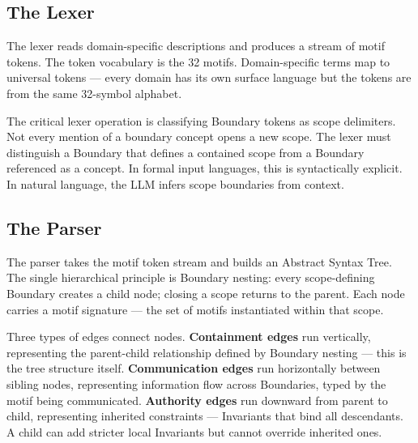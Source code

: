 \documentclass[11pt,a4paper]{article}
\begin{document}
\subsection{The Lexer}

The lexer reads domain-specific descriptions and produces a stream of motif tokens. The token vocabulary is the 32 motifs. Domain-specific terms map to universal tokens --- every domain has its own surface language but the tokens are from the same 32-symbol alphabet.

The critical lexer operation is classifying Boundary tokens as scope delimiters. Not every mention of a boundary concept opens a new scope. The lexer must distinguish a Boundary that defines a contained scope from a Boundary referenced as a concept. In formal input languages, this is syntactically explicit. In natural language, the LLM infers scope boundaries from context.

\subsection{The Parser}

The parser takes the motif token stream and builds an Abstract Syntax Tree. The single hierarchical principle is Boundary nesting: every scope-defining Boundary creates a child node; closing a scope returns to the parent. Each node carries a motif signature --- the set of motifs instantiated within that scope.

Three types of edges connect nodes. \textbf{Containment edges} run vertically, representing the parent-child relationship defined by Boundary nesting --- this is the tree structure itself. \textbf{Communication edges} run horizontally between sibling nodes, representing information flow across Boundaries, typed by the motif being communicated. \textbf{Authority edges} run downward from parent to child, representing inherited constraints --- Invariants that bind all descendants. A child can add stricter local Invariants but cannot override inherited ones.
\end{document}
